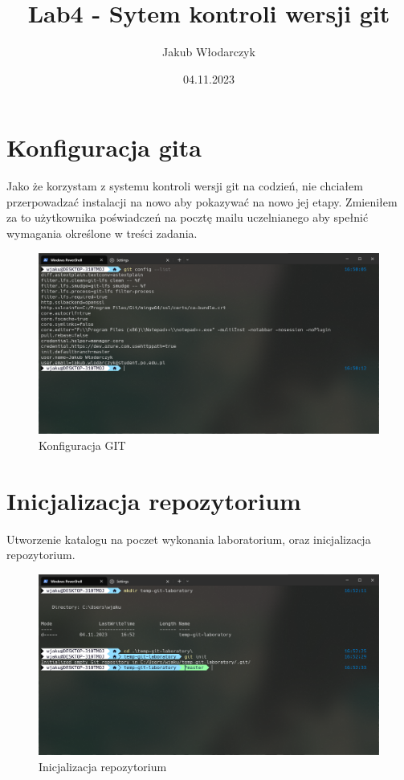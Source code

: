 \documentclass{article}
\title{Lab4 - Sytem kontroli wersji git}
\author{Jakub Włodarczyk}
\date{04.11.2023}
\begin{document}
\maketitle

\section{Konfiguracja gita}

Jako że korzystam z systemu kontroli wersji git na codzień, nie chciałem przerpowadzać instalacji na nowo aby pokazywać na nowo jej etapy. Zmieniłem za to użytkownika poświadczeń na pocztę mailu uczelnianego aby spełnić wymagania określone w treści zadania. 

\begin{figure}[!h]
    \caption{Konfiguracja GIT}
    \centerline{\includegraphics [scale=0.5]{config.PNG}}
    \label{fig:label}
\end{figure}
\newpage

\section{Inicjalizacja repozytorium}

Utworzenie katalogu na poczet wykonania laboratorium, oraz inicjalizacja repozytorium.

\vspace*{\fill}
\begin{figure}[!h]
    \caption{Inicjalizacja repozytorium}
    \centerline{\includegraphics [scale=0.5]{git-init.PNG}}
    \label{fig:label}
\end{figure}
\vspace*{\fill}
\newpage
\end{document}
